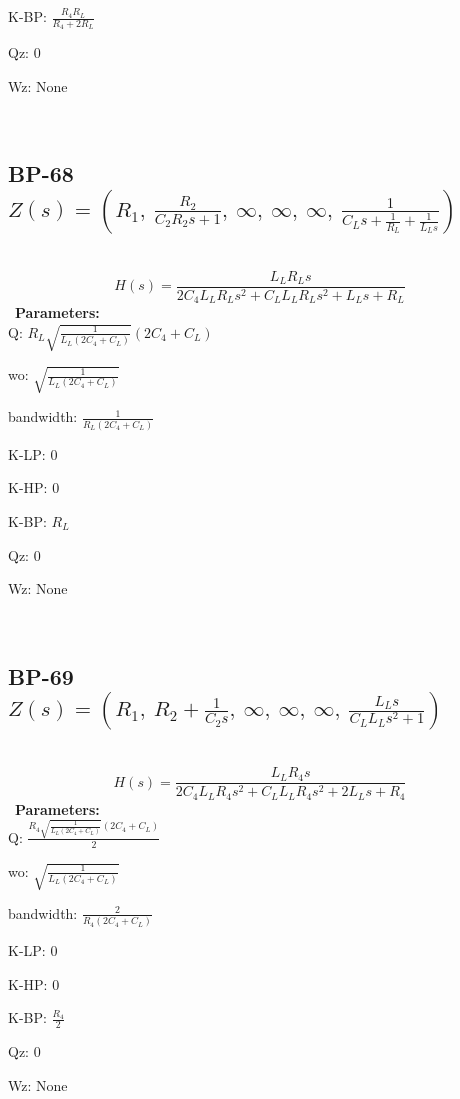 \documentclass{article}
\begin{document}
K-BP: $\frac{R_{4} R_{L}}{R_{4} + 2 R_{L}}$\ 

Qz: $0$\ 

Wz: $\text{None}$\ 

\ 

\subsection{BP-68 $Z(s) = \left( R_{1}, \  \frac{R_{2}}{C_{2} R_{2} s + 1}, \  \infty, \  \infty, \  \infty, \  \frac{1}{C_{L} s + \frac{1}{R_{L}} + \frac{1}{L_{L} s}}\right)$ } \ 
\textbf{\[H(s) = \frac{L_{L} R_{L} s}{2 C_{4} L_{L} R_{L} s^{2} + C_{L} L_{L} R_{L} s^{2} + L_{L} s + R_{L}}\] } \ 
\textbf{Parameters:}\\ 

Q: $R_{L} \sqrt{\frac{1}{L_{L} \left(2 C_{4} + C_{L}\right)}} \left(2 C_{4} + C_{L}\right)$\ 

wo: $\sqrt{\frac{1}{L_{L} \left(2 C_{4} + C_{L}\right)}}$\ 

bandwidth: $\frac{1}{R_{L} \left(2 C_{4} + C_{L}\right)}$\ 

K-LP: $0$\ 

K-HP: $0$\ 

K-BP: $R_{L}$\ 

Qz: $0$\ 

Wz: $\text{None}$\ 

\ 

\subsection{BP-69 $Z(s) = \left( R_{1}, \  R_{2} + \frac{1}{C_{2} s}, \  \infty, \  \infty, \  \infty, \  \frac{L_{L} s}{C_{L} L_{L} s^{2} + 1}\right)$ } \ 
\textbf{\[H(s) = \frac{L_{L} R_{4} s}{2 C_{4} L_{L} R_{4} s^{2} + C_{L} L_{L} R_{4} s^{2} + 2 L_{L} s + R_{4}}\] } \ 
\textbf{Parameters:}\\ 

Q: $\frac{R_{4} \sqrt{\frac{1}{L_{L} \left(2 C_{4} + C_{L}\right)}} \left(2 C_{4} + C_{L}\right)}{2}$\ 

wo: $\sqrt{\frac{1}{L_{L} \left(2 C_{4} + C_{L}\right)}}$\ 

bandwidth: $\frac{2}{R_{4} \left(2 C_{4} + C_{L}\right)}$\ 

K-LP: $0$\ 

K-HP: $0$\ 

K-BP: $\frac{R_{4}}{2}$\ 

Qz: $0$\ 

Wz: $\text{None}$\ 
\end{document}
